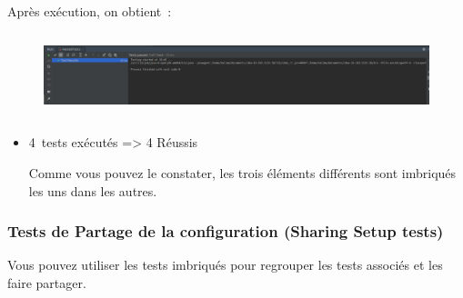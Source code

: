 \documentclass[12pt]{article}
\begin{document}
\par

Après exécution, on obtient :\par




\begin{figure}[H]
	\begin{Center}
		\includegraphics[width=6.3in,height=0.96in]{./media/image8.png}
	\end{Center}
\end{figure}



\par

\begin{itemize}
	\item 4\ tests exécutés => 4 Réussis  \par

\begin{justify}
Comme vous pouvez le constater, les trois éléments différents sont imbriqués les uns dans les autres.
\end{justify}\par


\end{itemize}\subsubsection{Tests de Partage de la configuration (Sharing Setup tests) }

\begin{justify}
Vous pouvez utiliser les tests imbriqués pour regrouper les tests associés et les faire partager.
\end{justify}\par



\end{document}
